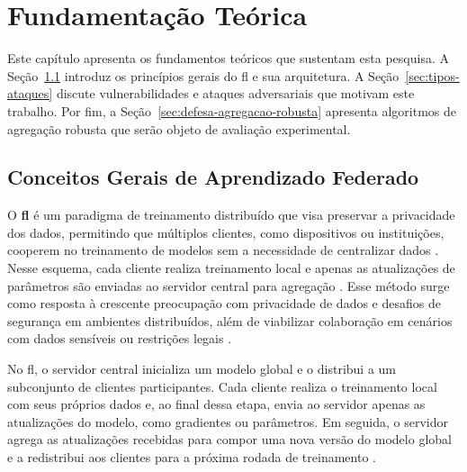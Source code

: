 \chapter{Fundamentação Teórica}
\label{cap:fundamentacao-teorica}

Este capítulo apresenta os fundamentos teóricos que sustentam esta pesquisa. A Seção~\ref{sec:conceitos-fl} introduz os princípios gerais do \gls{fl} e sua arquitetura. A Seção~\ref{sec:tipos-ataques} discute vulnerabilidades e ataques adversariais que motivam este trabalho. Por fim, a Seção~\ref{sec:defesa-agregacao-robusta} apresenta algoritmos de agregação robusta que serão objeto de avaliação experimental.

\section{Conceitos Gerais de Aprendizado Federado}
\label{sec:conceitos-fl}

O \textbf{\gls{fl}} é um paradigma de treinamento distribuído que visa preservar a privacidade dos dados, permitindo que múltiplos clientes, como dispositivos ou instituições, cooperem no treinamento de modelos sem a necessidade de centralizar dados \cite{McMahan2017}. Nesse esquema, cada cliente realiza treinamento local e apenas as atualizações de parâmetros são enviadas ao servidor central para agregação \cite{Moshawrab2023}. Esse método surge como resposta à crescente preocupação com privacidade de dados e desafios de segurança em ambientes distribuídos, além de viabilizar colaboração em cenários com dados sensíveis ou restrições legais \cite{Kairouz2021}.


No \gls{fl}, o servidor central inicializa um modelo global e o distribui a um subconjunto de clientes participantes. Cada cliente realiza o treinamento local com seus próprios dados e, ao final dessa etapa, envia ao servidor apenas as atualizações do modelo, como gradientes ou parâmetros. Em seguida, o servidor agrega as atualizações recebidas para compor uma nova versão do modelo global e a redistribui aos clientes para a próxima rodada de treinamento \cite{Moshawrab2023}.

